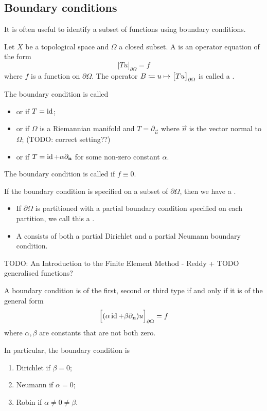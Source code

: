 \subsection{Boundary conditions}
It is often useful to identify a subset of functions using boundary conditions.
\begin{definition}
Let $X$ be a topological space and $\Omega$ a closed subset. A  is an operator equation of the form
\[ \big[Tu\big]_{\partial\Omega} = f \]
where $f$ is a function on $\partial\Omega$. The operator $B\coloneqq u\mapsto \big[Tu\big]_{\partial\Omega}$ is called a .

The boundary condition is called
\begin{itemize}
\item {} or  if $T = \operatorname{id}$;
\item {} or  if $\Omega$ is a Riemannian manifold and $T = \partial_{\vec{n}}$ where $\vec{n}$ is the vector normal to $\Omega$; (TODO: correct setting??)
\item {} or  if $T = \operatorname{id} + \alpha \partial_{\boldsymbol{\mathrm{n}}}$ for some non-zero constant $\alpha$.
\end{itemize}
The boundary condition is called  if $f\equiv 0$.

If the boundary condition is specified on a subset of $\partial\Omega$, then we have a .
\begin{itemize}
\item If $\partial\Omega$ is partitioned with a partial boundary condition specified on each partition, we call this a .
\item A  consists of both a partial Dirichlet and a partial Neumann boundary condition.
\end{itemize}
\end{definition}
TODO: An Introduction to the Finite Element Method - Reddy + TODO generalised functions?

\begin{lemma}
A boundary condition is of the first, second or third type \textup{if and only if} it is of the general form
\[ \Big[(\alpha\operatorname{id} + \beta\partial_{\boldsymbol{\mathrm{n}}})u\Big]_{\partial\Omega} = f \]
where $\alpha, \beta$ are constants that are not both zero.

In particular, the boundary condition is
\begin{enumerate}
\item Dirichlet if $\beta = 0$;
\item Neumann if $\alpha = 0$;
\item Robin if $\alpha \neq 0 \neq \beta$.
\end{enumerate}
\end{lemma}

